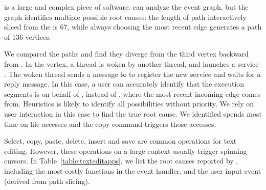 
 is a large and complex piece of software. \xxx can analyze
the event graph, but the graph identifies multiple possible root causes: the length of
path interactively sliced from the \spinningnode is 67, while 
always choosing the most recent edge generates a path of 136 vertices.

We compared the paths and find they diverge from the third vertex backward
from \spinningnode. In the vertex, a  thread is
woken by another  thread, and launches a service
. The woken thread sends a message
to  to register the new service and waits for a reply message. In
this case, a user can accurately identify that the execution segments is on
behalf of , instead of . where the most recent
incoming edge comes from. Heuristics is likely to identify all possibilities
without priority. We rely on user interaction in this case to find the true root
cause. We identified  spends most time on file accesses and
the copy command triggers those accesses.



Select, copy, paste, delete, insert and save are common operations for text
editing. However, these operations on a large context usually trigger spinning
cursors. In Table~\ref{table:texteditapps}, we list the root causes reported by
\xxx, including the most costly functions in the event handler, and the user
input event (derived from path slicing).

